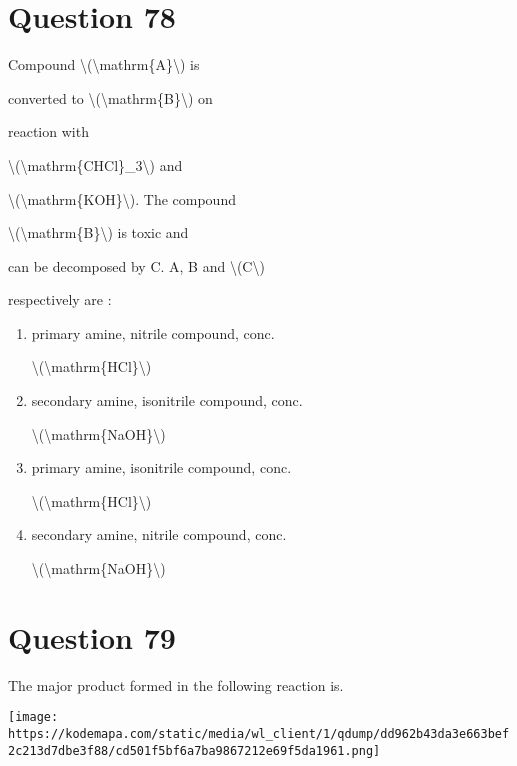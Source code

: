 \documentclass{article}
\begin{document}
\section*{Question 78}
Compound \textbackslash(\textbackslash mathrm\{A\}\textbackslash) is

converted to \textbackslash(\textbackslash mathrm\{B\}\textbackslash) on

reaction with

\textbackslash(\textbackslash mathrm\{CHCl\}\_3\textbackslash) and

\textbackslash(\textbackslash mathrm\{KOH\}\textbackslash). The compound

\textbackslash(\textbackslash mathrm\{B\}\textbackslash) is toxic and

can be decomposed by C. A, B and \textbackslash(C\textbackslash)

respectively are :


\begin{enumerate}[label=(\alph*)]
\item primary amine, nitrile compound, conc.

\textbackslash(\textbackslash mathrm\{HCl\}\textbackslash)


\item secondary amine, isonitrile compound, conc.

\textbackslash(\textbackslash mathrm\{NaOH\}\textbackslash)


\item primary amine, isonitrile compound, conc.

\textbackslash(\textbackslash mathrm\{HCl\}\textbackslash)


\item secondary amine, nitrile compound, conc.

\textbackslash(\textbackslash mathrm\{NaOH\}\textbackslash)


\end{enumerate}
\newpage
\section*{Question 79}
The major product formed in the following reaction is.



\texttt{[image: https://kodemapa.com/static/media/wl\_client/1/qdump/dd962b43da3e663bef2c213d7dbe3f88/cd501f5bf6a7ba9867212e69f5da1961.png]}\\
\end{document}
